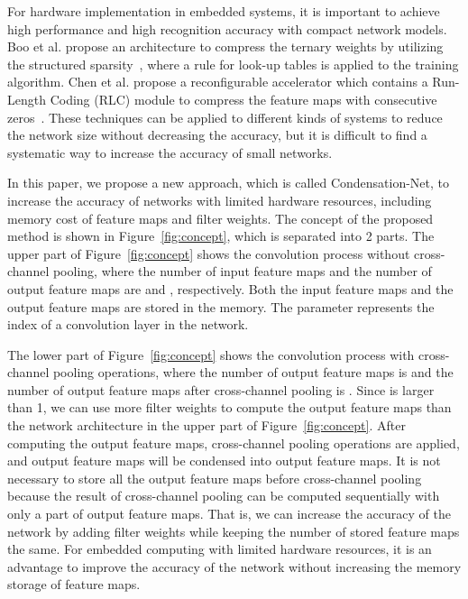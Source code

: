 \documentclass[10pt,twocolumn,letterpaper]{article}
\begin{document}
For hardware implementation in embedded systems, it is important to achieve high performance and high recognition accuracy with compact network models. Boo et al. propose an architecture to compress the ternary weights by utilizing the structured sparsity~\cite{Boo17}, where a rule for look-up tables is applied to the training algorithm. Chen et al. propose a reconfigurable accelerator which contains a Run-Length Coding (RLC) module to compress the feature maps with consecutive zeros~\cite{YhChen17}. These techniques can be applied to different kinds of systems to reduce the network size without decreasing the accuracy, but it is difficult to find a systematic way to increase the accuracy of small networks.



In this paper, we propose a new approach, which is called Condensation-Net, to increase the accuracy of networks with limited hardware resources, including memory cost of feature maps and filter weights. The concept of the proposed method is shown in Figure~\ref{fig:concept}, which is separated into 2 parts. The upper part of Figure~\ref{fig:concept} shows the convolution process without cross-channel pooling, where the number of input feature maps and the number of output feature maps are  and , respectively. Both the input feature maps and the output feature maps are stored in the memory. The parameter  represents the index of a convolution layer in the network. 

The lower part of Figure~\ref{fig:concept} shows the convolution process with cross-channel pooling operations, where the number of output feature maps is  and the number of output feature maps after cross-channel pooling is . Since  is larger than 1, we can use more filter weights to compute the output feature maps than the network architecture in the upper part of Figure~\ref{fig:concept}. After computing the output feature maps, cross-channel pooling operations are applied, and  output feature maps will be condensed into  output feature maps. It is not necessary to store all the output feature maps before cross-channel pooling because the result of cross-channel pooling can be computed sequentially with only a part of output feature maps. That is, we can increase the accuracy of the network by adding filter weights while keeping the number of stored feature maps the same. For embedded computing with limited hardware resources, it is an advantage to improve the accuracy of the network without increasing the memory storage of feature maps.
\end{document}
